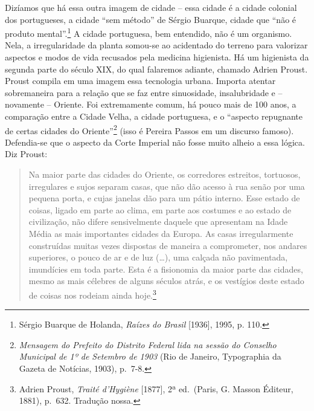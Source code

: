 Dizíamos que há essa outra imagem de cidade -- essa cidade é a cidade
colonial dos portugueses, a cidade ``sem método'' de Sérgio Buarque,
cidade que ``não é produto mental''.\footnote{Sérgio Buarque de Holanda,
  \emph{Raízes do Brasil} {[}1936{]}, 1995, p. 110.} A cidade
portuguesa, bem entendido, não é um organismo. Nela, a irregularidade da
planta somou-se ao acidentado do terreno para valorizar aspectos e modos
de vida recusados pela medicina higienista. Há um higienista da segunda
parte do século XIX, do qual falaremos adiante, chamado Adrien Proust.
Proust compila em uma imagem essa tecnologia urbana. Importa atentar
sobremaneira para a relação que se faz entre sinuosidade, insalubridade
e -- novamente -- Oriente. Foi extremamente comum, há pouco mais de 100
anos, a comparação entre a Cidade Velha, a cidade portuguesa, e o
``aspecto repugnante de certas cidades do Oriente''\footnote{\emph{Mensagem
  do Prefeito do Distrito Federal lida na sessão do Conselho Municipal
  de 1º de Setembro de 1903} (Rio de Janeiro, Typographia da Gazeta de
  Notícias, 1903), p.~7-8.} (isso é Pereira Passos em um discurso
famoso). Defendia-se que o aspecto da Corte Imperial não fosse muito
alheio a essa lógica. Diz Proust:

\begin{quote}
Na maior parte das cidades do Oriente, os corredores estreitos,
tortuosos, irregulares e sujos separam casas, que não dão acesso à rua
senão por uma pequena porta, e cujas janelas dão para um pátio interno.
Esse estado de coisas, ligado em parte ao clima, em parte aos costumes e
ao estado de civilização, não difere sensivelmente daquele que
apresentam na Idade Média as mais importantes cidades da Europa. As
casas irregularmente construídas muitas vezes dispostas de maneira a
comprometer, nos andares superiores, o pouco de ar e de luz (\ldots{}),
uma calçada não pavimentada, imundícies em toda parte. Esta é a
fisionomia da maior parte das cidades, mesmo as mais célebres de alguns
séculos atrás, e os vestígios deste estado de coisas nos rodeiam ainda
hoje.\footnote{Adrien Proust, \emph{Traité d'Hygiène} {[}1877{]}, 2ª
  ed.~(Paris, G. Masson Éditeur, 1881), p.~632. Tradução nossa.}
\end{quote}

